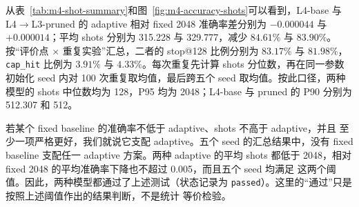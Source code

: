 从表~\ref{tab:m4-shot-summary}和图~\ref{fig:m4-accuracy-shots}可以看到，L4-base 与
L4$\to$L3-pruned 的 adaptive 相对 fixed 2048 准确率差分别为
$-0.000044$ 与 $+0.000014$；平均 shots 分别为 315.228 与 329.777，减少
$84.61\%$ 与 $83.90\%$。按“评价点 $\times$ 重复实验”汇总，二者的
stop@128 比例分别为 $83.17\%$ 与 $81.98\%$，\texttt{cap\_hit} 比例为
$3.91\%$ 与 $4.33\%$。每次重复先计算 shots 分位数，再在同一参数
初始化 seed 内对 100 次重复取均值，最后跨五个 seed 取均值。按此口径，两种
模型的 shots 中位数均为 128，P95 均为 2048；L4-base 与 pruned 的 P90
分别为 512.307 和 512。

若某个 fixed baseline 的准确率不低于 adaptive、shots 不高于 adaptive，并且
至少一项严格更好，我们就说它支配 adaptive。五个 seed 的汇总结果中，没有
fixed baseline 支配任一 adaptive 方案。两种 adaptive 的平均 shots 都低于
2048，相对 fixed 2048 的平均准确率下降也不超过 0.005，而且五个 seed 均满足
这两个阈值。因此，两种模型都通过了上述测试（状态记录为
\texttt{passed}）。这里的“通过”只是按照上述阈值作出的结果判断，不是统计
等价检验。
